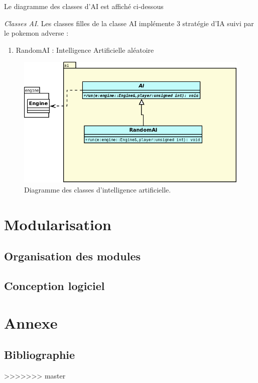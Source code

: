 \documentclass[a4paper,12pt]{article}
\begin{document}
    Le diagramme des classes d'AI est affiché ci-dessous
    
    \emph{Classes AI}. Les classes filles de la classe AI implémente 3 stratégie d'IA suivi par le pokemon adverse :\begin{enumerate}
        \item RandomAI : Intelligence Artificielle aléatoire
    \end{enumerate}


    \begin{landscape}
    \begin{figure}[p]
    \includegraphics[width=0.9\paperheight]{ai.png}
    \caption{\label{uml:ai}Diagramme des classes d'intelligence artificielle.}
    \end{figure}
    \end{landscape}


    \section{Modularisation}
    \label{sec:module}

    \subsection{Organisation des modules}

    \clearpage
    \subsection{Conception logiciel}
    
    \clearpage
    \section{Annexe}
    \label{sec:Annexe}
    \subsection{Bibliographie}

>>>>>>> master
\end{document}
